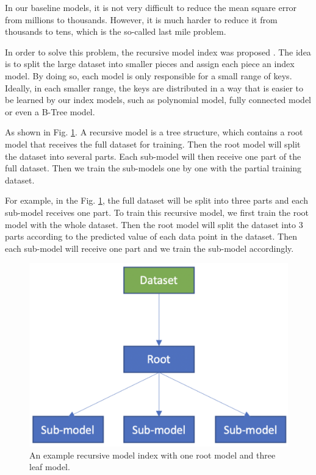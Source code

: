 
In our baseline models, it is not very difficult to reduce the mean square error from millions to thousands. However, it is much harder to reduce it from thousands to tens, which is the so-called last mile problem.

In order to solve this problem, the recursive model index was proposed \cite{kraska2018case}. The idea is to split the large dataset into smaller pieces and assign each piece an index model. By doing so, each model is only responsible for a small range of keys. Ideally, in each smaller range, the keys are distributed in a way that is easier to be learned by our index models, such as polynomial model, fully connected model or even a B-Tree model.

As shown in Fig. \ref{rmi_structure}. A recursive model is a tree structure, which contains a root model that receives the full dataset for training. Then the root model will split the dataset into several parts. Each sub-model will then receive one part of the full dataset. Then we train the sub-models one by one with the partial training dataset. 

\begin{mscexample}
	For example, in the Fig. \ref{rmi_structure}, the full dataset will be split into three parts and each sub-model receives one part. To train this recursive model, we first train the root model with the whole dataset. Then the root model will split the dataset into 3 parts according to the predicted value of each data point in the dataset. Then each sub-model will receive one part and we train the sub-model accordingly.
\end{mscexample}

\begin{figure}[h]
\centering
\includegraphics[scale=0.4]{graphs/implementation/one-dim/rmi_demo.pdf}
\caption{An example recursive model index with one root model and three leaf model.}
\label{rmi_structure}
\end{figure}

